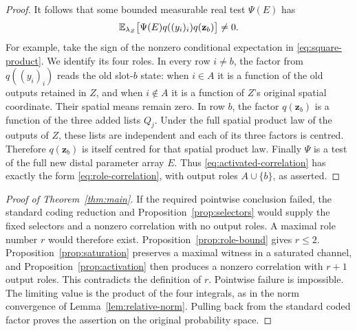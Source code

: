 \begin{proof}
It follows that some bounded measurable real test $\Psi(E)$ has
\begin{equation}\label{eq:activated-correlation}
 \mathbb E_{\lambda_Z}\bigl[
       \Psi(E)q((y_i)_i)q(\mathbf z_b)\bigr]\ne0.
\end{equation}
For example, take the sign of the nonzero conditional expectation
in \eqref{eq:square-product}. We identify its four roles. In every
row $i\ne b$, the factor from $q((y_i)_i)$ reads the old slot-$b$
state: when $i\in A$ it is a function of the old outputs retained in
$Z$, and when $i\notin A$ it is a function of $Z$'s original spatial
coordinate. Their spatial means remain zero. In row $b$, the factor
$q(\mathbf z_b)$ is a function of the three added lists $Q_j$.
Under the full spatial product law of the outputs of $Z$, these lists
are independent and each of its three factors is centred. Therefore
$q(\mathbf z_b)$ is itself centred for that spatial product law.
Finally $\Psi$ is a test of the full new distal parameter array $E$.
Thus \eqref{eq:activated-correlation} has exactly the form
\eqref{eq:role-correlation}, with output roles $A\cup\{b\}$, as
asserted.
\end{proof}

\begin{proof}[Proof of Theorem~\ref{thm:main}]
If the required pointwise conclusion failed, the standard coding
reduction and Proposition~\ref{prop:selectors} would supply the fixed
selectors and a nonzero correlation with no output roles. A maximal
role number $r$ would therefore exist. Proposition~\ref{prop:role-bound}
gives $r\le2$. Proposition~\ref{prop:saturation} preserves a maximal
witness in a saturated channel, and Proposition~\ref{prop:activation}
then produces a nonzero correlation with $r+1$ output roles. This
contradicts the definition of $r$. Pointwise failure is impossible.
The limiting value is the product of the four integrals, as in the
norm convergence of Lemma~\ref{lem:relative-norm}. Pulling back from
the standard coded factor proves the assertion on the original
probability space.
\end{proof}
